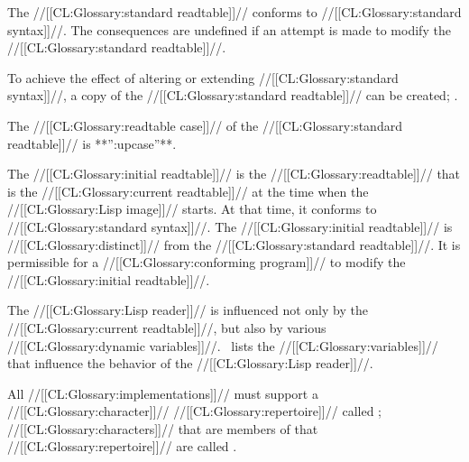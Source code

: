 \endsubsubsection%


The //[[CL:Glossary:standard readtable]]// conforms to //[[CL:Glossary:standard syntax]]//.
The consequences are undefined if an attempt is made
to modify the //[[CL:Glossary:standard readtable]]//.

To achieve the effect of altering or extending //[[CL:Glossary:standard syntax]]//,
a copy of the //[[CL:Glossary:standard readtable]]// can be created; .

The //[[CL:Glossary:readtable case]]// of the //[[CL:Glossary:standard readtable]]// is **'':upcase''**.

\endsubsubsection%


The //[[CL:Glossary:initial readtable]]// is
the //[[CL:Glossary:readtable]]// that is the //[[CL:Glossary:current readtable]]//
at the time when the //[[CL:Glossary:Lisp image]]// starts.
At that time, it conforms to //[[CL:Glossary:standard syntax]]//.
The //[[CL:Glossary:initial readtable]]// is //[[CL:Glossary:distinct]]// 
from the //[[CL:Glossary:standard readtable]]//.
It is permissible for a //[[CL:Glossary:conforming program]]// 
to modify the //[[CL:Glossary:initial readtable]]//.

\endsubsubsection%

\endSubsection%


The //[[CL:Glossary:Lisp reader]]// is influenced not only by the //[[CL:Glossary:current readtable]]//,
but also by various //[[CL:Glossary:dynamic variables]]//.  \Thenextfigure\ lists
the //[[CL:Glossary:variables]]// that influence the behavior of the //[[CL:Glossary:Lisp reader]]//.


\endsubsection%





All //[[CL:Glossary:implementations]]// must support a //[[CL:Glossary:character]]// //[[CL:Glossary:repertoire]]//
called ; //[[CL:Glossary:characters]]// that are members of that
//[[CL:Glossary:repertoire]]// are called .

